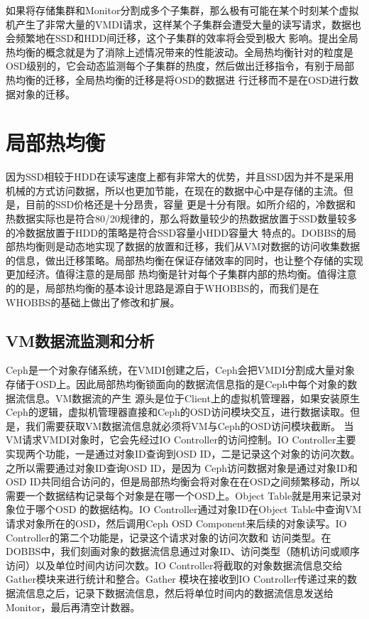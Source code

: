 如果将存储集群和Monitor分割成多个子集群，那么极有可能在某个时刻某个虚拟机产生了非常大量的VMDI请求，这样某个子集群会遭受大量的读写请求，数据也会频繁地在SSD和HDD间迁移，这个子集群的效率将会受到极大
影响。提出全局热均衡的概念就是为了消除上述情况带来的性能波动。全局热均衡针对的粒度是OSD级别的，它会动态监测每个子集群的热度，然后做出迁移指令，有别于局部热均衡的迁移，全局热均衡的迁移是将OSD的数据进
行迁移而不是在OSD进行数据对象的迁移。

\section{局部热均衡}
因为SSD相较于HDD在读写速度上都有非常大的优势，并且SSD因为并不是采用机械的方式访问数据，所以也更加节能，在现在的数据中心中是存储的主流。但是，目前的SSD价格还是十分昂贵，容量
更是十分有限。如所介绍的，冷数据和热数据实际也是符合80/20规律的，那么将数量较少的热数据放置于SSD数量较多的冷数据放置于HDD的策略是符合SSD容量小HDD容量大
特点的。DOBBS的局部热均衡则是动态地实现了数据的放置和迁移，我们从VM对数据的访问收集数据的信息，做出迁移策略。局部热均衡在保证存储效率的同时，也让整个存储的实现更加经济。值得注意的是局部
热均衡是针对每个子集群内部的热均衡。值得注意的的是，局部热均衡的基本设计思路是源自于WHOBBS\cite{lingxuan2015whobbs}的，而我们是在WHOBBS的基础上做出了修改和扩展。

\subsection{VM数据流监测和分析}
Ceph是一个对象存储系统，在VMDI创建之后，Ceph会把VMDI分割成大量对象存储于OSD上\cite{weil2006ceph}。因此局部热均衡锁面向的数据流信息指的是Ceph中每个对象的数据流信息。VM数据流的产生
源头是位于Client上的虚拟机管理器，如果安装原生Ceph的逻辑，虚拟机管理器直接和Ceph的OSD访问模块交互，进行数据读取。但是，我们需要获取VM数据流信息就必须将VM与Ceph的OSD访问模块截断。
当VM请求VMDI对象时，它会先经过IO Controller的访问控制。IO Controller主要实现两个功能，一是通过对象ID查询到OSD ID，二是记录这个对象的访问次数。之所以需要通过对象ID查询OSD ID，是因为
Ceph访问数据对象是通过对象ID和OSD ID共同组合访问的，但是局部热均衡会将对象在在OSD之间频繁移动，所以需要一个数据结构记录每个对象是在哪一个OSD上。Object Table就是用来记录对象位于哪个OSD
的数据结构。IO Controller通过对象ID在Object Table中查询VM请求对象所在的OSD，然后调用Ceph OSD Component来后续的对象读写。IO Controller的第二个功能是，记录这个请求对象的访问次数和
访问类型。在DOBBS中，我们刻画对象的数据流信息通过对象ID、访问类型（随机访问或顺序访问）以及单位时间内访问次数。IO Controller将截取的对象数据流信息交给Gather模块来进行统计和整合。Gather
模块在接收到IO Controller传递过来的数据流信息之后，记录下数据流信息，然后将单位时间内的数据流信息发送给Monitor，最后再清空计数器。

